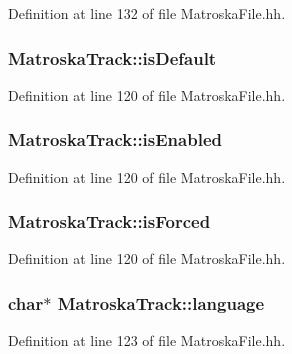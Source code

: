 Definition at line 132 of file Matroska\+File.\+hh.

\subsubsection[{is\+Default}]{ Matroska\+Track\+::is\+Default}\label{classMatroskaTrack_a5a90170ea4fd31ca3605f7e04d4d278a}


Definition at line 120 of file Matroska\+File.\+hh.

\subsubsection[{is\+Enabled}]{ Matroska\+Track\+::is\+Enabled}\label{classMatroskaTrack_a4d50777039372de8a4a5167e78d6cf76}


Definition at line 120 of file Matroska\+File.\+hh.

\subsubsection[{is\+Forced}]{ Matroska\+Track\+::is\+Forced}\label{classMatroskaTrack_a66cfbca8780e0c0795aa2f05673c382e}


Definition at line 120 of file Matroska\+File.\+hh.

\subsubsection[{language}]{\setlength{\rightskip}{0pt plus 5cm}char$\ast$ Matroska\+Track\+::language}\label{classMatroskaTrack_acae3c7c284cbb3ae78744212d2e23628}


Definition at line 123 of file Matroska\+File.\+hh.

